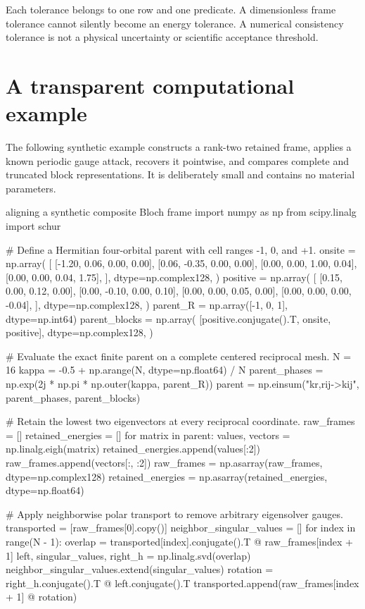 Each tolerance belongs to one row and one predicate. A dimensionless frame
tolerance cannot silently become an energy tolerance. A numerical consistency
tolerance is not a physical uncertainty or scientific acceptance threshold.

\section{A transparent computational example}

The following synthetic example constructs a rank-two retained frame, applies a
known periodic gauge attack, recovers it pointwise, and compares complete and
truncated block representations. It is deliberately small and contains no
material parameters.

\begin{pythonexample}{aligning a synthetic composite Bloch frame}
import numpy as np
from scipy.linalg import schur

# Define a Hermitian four-orbital parent with cell ranges -1, 0, and +1.
onsite = np.array(
    [
        [-1.20, 0.06, 0.00, 0.00],
        [0.06, -0.35, 0.00, 0.00],
        [0.00, 0.00, 1.00, 0.04],
        [0.00, 0.00, 0.04, 1.75],
    ],
    dtype=np.complex128,
)
positive = np.array(
    [
        [0.15, 0.00, 0.12, 0.00],
        [0.00, -0.10, 0.00, 0.10],
        [0.00, 0.00, 0.05, 0.00],
        [0.00, 0.00, 0.00, -0.04],
    ],
    dtype=np.complex128,
)
parent_R = np.array([-1, 0, 1], dtype=np.int64)
parent_blocks = np.array(
    [positive.conjugate().T, onsite, positive],
    dtype=np.complex128,
)

# Evaluate the exact finite parent on a complete centered reciprocal mesh.
N = 16
kappa = -0.5 + np.arange(N, dtype=np.float64) / N
parent_phases = np.exp(2j * np.pi * np.outer(kappa, parent_R))
parent = np.einsum("kr,rij->kij", parent_phases, parent_blocks)

# Retain the lowest two eigenvectors at every reciprocal coordinate.
raw_frames = []
retained_energies = []
for matrix in parent:
    values, vectors = np.linalg.eigh(matrix)
    retained_energies.append(values[:2])
    raw_frames.append(vectors[:, :2])
raw_frames = np.asarray(raw_frames, dtype=np.complex128)
retained_energies = np.asarray(retained_energies, dtype=np.float64)

# Apply neighborwise polar transport to remove arbitrary eigensolver gauges.
transported = [raw_frames[0].copy()]
neighbor_singular_values = []
for index in range(N - 1):
    overlap = transported[index].conjugate().T @ raw_frames[index + 1]
    left, singular_values, right_h = np.linalg.svd(overlap)
    neighbor_singular_values.extend(singular_values)
    rotation = right_h.conjugate().T @ left.conjugate().T
    transported.append(raw_frames[index + 1] @ rotation)


\end{pythonexample}
